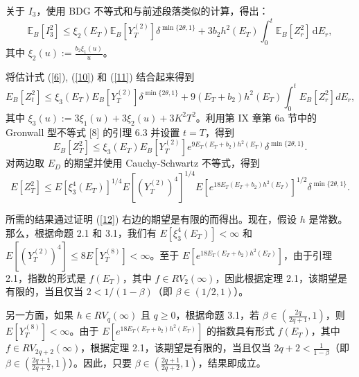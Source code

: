 \documentclass[12pt,final]{article}
\numberwithin{equation}{section}
\numberwithin{figure}{section}
\numberwithin{table}{section}
\theoremstyle{plain}
\begin{document}
	关于 $I_3$，使用 BDG 不等式和与前述段落类似的计算，得出：
	\begin{equation}\label{11}
		\mathbb{E}_B[I_3^2] \leq \xi_2(E_T) \mathbb{E}_B[Y_T^{(2)}] \delta^{\min\{2\theta, 1\}} + 3 b_2 h^2(E_T) \int_0^t \mathbb{E}_B[Z_r^2] \, \mathrm{d}E_r,
	\end{equation}
	其中 $\xi_2(u) := \frac{b_2 \xi_1(u)}{u}$。
	
	将估计式 (\ref{6}), (\ref{10}) 和 (\ref{11}) 结合起来得到
	\[
	E_{B}\left[Z_{t}^{2}\right] \leq \xi_{3}\left(E_{T}\right) E_{B}\left[Y_{T}^{(2)}\right] \delta^{\min\{2\theta, 1\}} + 9\left(E_{T} + b_{2}\right) h^{2}\left(E_{T}\right) \int_{0}^{t} E_{B}\left[Z_{r}^{2}\right] d E_{r},
	\]
	其中 \(\xi_{3}(u) := 3\xi_{1}(u) + 3\xi_{2}(u) + 3 K^{2} T^{2}\)。利用第 IX 章第 6a 节中的 Gronwall 型不等式 [8] 的引理 6.3 并设置 \(t = T\)，得到
	\[
	E_{B}\left[Z_{T}^{2}\right] \leq \xi_{3}\left(E_{T}\right) E_{B}\left[Y_{T}^{(2)}\right] e^{9 E_{T}\left(E_{T} + b_{2}\right) h^{2}\left(E_{T}\right)} \delta^{\min\{2\theta, 1\}}.
	\]
	对两边取 \(E_{D}\) 的期望并使用 Cauchy-Schwartz 不等式，得到
	\begin{equation}\label{12}
		E\left[Z_T^2\right] \leq E\left[\xi_3^4\left(E_T\right)\right]^{1/4} E\left[\left(Y_T^{(2)}\right)^4\right]^{1/4} E\left[e^{18 E_T\left(E_T + b_2\right) h^2\left(E_T\right)}\right]^{1/2} \delta^{\min\{2\theta, 1\}}.
	\end{equation}
	
	
	所需的结果通过证明 (\ref{12}) 右边的期望是有限的而得出。现在，假设 \(h\) 是常数。那么，根据命题 2.1 和 3.1，我们有 \(E\left[\xi_{3}^{4}\left(E_{T}\right)\right] < \infty\) 和 \(E\left[\left(Y_{T}^{(2)}\right)^{4}\right] \leq 8 E\left[Y_{T}^{(8)}\right] < \infty\)。至于 \(E\left[e^{18 E_{T}\left(E_{T} + b_{2}\right) h^{2}\left(E_{T}\right)}\right]\)，由于引理 2.1，指数的形式是 \(f\left(E_{T}\right)\)，其中 \(f \in RV_{2}(\infty)\)，因此根据定理 2.1，该期望是有限的，当且仅当 \(2 < 1/(1-\beta)\)（即 \(\beta \in (1/2, 1)\)）。
	
	另一方面，如果 \( h \in RV_{q}(\infty) \) 且 \( q \geq 0 \)，根据命题 3.1，若 \( \beta \in \left( \frac{2q}{2q+1}, 1 \right) \)，则 \( E\left[Y_{T}^{(8)}\right] < \infty \)。由于 \( E\left[ e^{18 E_T \left( E_T + b_2 \right) h^2 \left( E_T \right)} \right] \) 的指数具有形式 \( f\left( E_{T} \right) \)，其中 \( f \in RV_{2q+2}(\infty) \)，根据定理 2.1，该期望是有限的，当且仅当 \( 2q+2 < \frac{1}{1-\beta} \)（即 \( \beta \in \left( \frac{2q+1}{2q+2}, 1 \right) \)）。因此，只要 \( \beta \in \left( \frac{2q+1}{2q+2}, 1 \right) \)，结果即成立。
	
\end{document}
